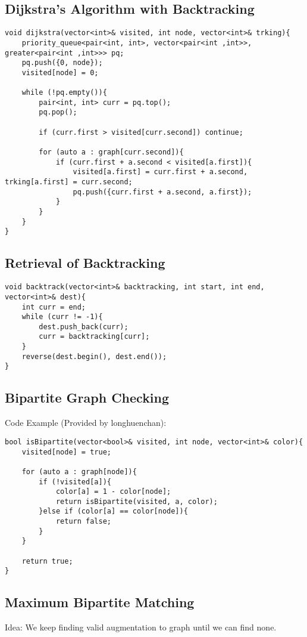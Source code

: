 \documentclass{article}
\begin{document}
\subsection{Dijkstra's Algorithm with Backtracking}
\begin{verbatim}
void dijkstra(vector<int>& visited, int node, vector<int>& trking){
    priority_queue<pair<int, int>, vector<pair<int ,int>>, greater<pair<int ,int>>> pq;
    pq.push({0, node});
    visited[node] = 0;

    while (!pq.empty()){
        pair<int, int> curr = pq.top();
        pq.pop();

        if (curr.first > visited[curr.second]) continue;
        
        for (auto a : graph[curr.second]){
            if (curr.first + a.second < visited[a.first]){
                visited[a.first] = curr.first + a.second, trking[a.first] = curr.second;
                pq.push({curr.first + a.second, a.first});
            }
        }
    }
}
\end{verbatim}

\subsection{Retrieval of Backtracking}
\begin{verbatim}
void backtrack(vector<int>& backtracking, int start, int end, vector<int>& dest){
    int curr = end;
    while (curr != -1){
        dest.push_back(curr);
        curr = backtracking[curr];
    }
    reverse(dest.begin(), dest.end());
}
\end{verbatim}

\subsection{Bipartite Graph Checking}
\pagebreak
Code Example (Provided by longhuenchan):
\begin{verbatim}
bool isBipartite(vector<bool>& visited, int node, vector<int>& color){
    visited[node] = true;

    for (auto a : graph[node]){
        if (!visited[a]){
            color[a] = 1 - color[node];
            return isBipartite(visited, a, color);
        }else if (color[a] == color[node]){
            return false;
        }
    }

    return true;
}
\end{verbatim}

\subsection{Maximum Bipartite Matching}
Idea: We keep finding valid augmentation to graph until we can find none.
\end{document}
